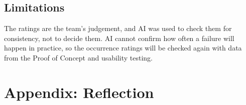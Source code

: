 \documentclass{article}
\begin{document}
\subsection{Limitations}

The ratings are the team's judgement, and AI was used to check them for
consistency, not to decide them. AI cannot confirm how often a failure will
happen in practice, so the occurrence ratings will be checked again with data
from the Proof of Concept and usability testing.



\newpage{}

\section{Appendix:  Reflection}


\end{document}
